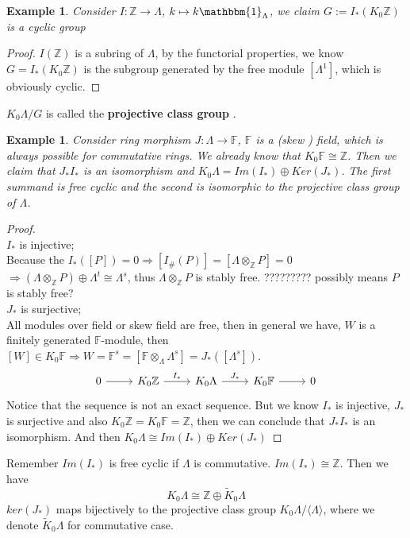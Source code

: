 \documentclass[11pt]{article}
\newtheorem{ex}[thm]{Example}
\newcommand{\intg}{\mathbb Z}
\newcommand{\bbf}{\mathbb F}
\newcommand{\rta}{\rightarrow}
\newcommand{\Lrta}{\Longrightarrow}
\newcommand{\lgl}{\langle}
\newcommand{\rgl}{\rangle}
\begin{document}
\begin{ex}
Consider $I: \intg \rta \Lambda$, $k\mapsto k \mathbbm{1}_\Lambda$, we claim $G:=I_*(K_0 \intg)$ is a cyclic group
\end{ex}
\begin{proof}
$I(\intg)$ is a subring of $\Lambda$, by the functorial properties, we know $G=I_*(K_0 \intg)$ is the subgroup generated by the free module $[\Lambda^1]$, which is obviously cyclic.
\end{proof}
$K_0\Lambda/G $ is called the \textbf{projective class group }.

\begin{ex}
Consider ring morphism 
$J:\Lambda\rta \bbf$, $\bbf$ is a (skew ) field, which is always possible for commutative rings. We already know that $K_0\bbf\cong \intg$. Then we claim that $J_* I_*$ is an isomorphism and $K_0 \Lambda = Im (I_*)\oplus Ker (J_*)$. The first summand is free cyclic and the second is isomorphic to the projective class group of $\Lambda$.
\end{ex}

\begin{proof}\ \\ 
$I_*$ is injective;\\ 
Because the $I_*([P])=0\Lrta [I_\#(P)]=[\Lambda \otimes_{\intg} P]=0$ $\Lrta (\Lambda\otimes_\intg P)\oplus \Lambda^t\cong \Lambda^s$, thus $\Lambda\otimes_\intg P$ is stably free. ????????? possibly means $P$ is stably free?\\
$J_*$ is surjective;\\
All modules over field or skew field are free, then in general we have, $W$ is a finitely generated $\bbf$-module, then $[W]\in K_0 \bbf\Lrta W=\bbf^s=[\bbf \otimes_\Lambda \Lambda^s]=J_*([\Lambda^s])$.
\[ \begin{tikzcd}
	0\arrow{r}&K_0 \intg \arrow{r}{I_*} & K_0 \Lambda \arrow{r}{J_*} & K_0 \bbf\arrow{r}& 0%
	\end{tikzcd}\]	
Notice that the sequence is not an exact sequence. But we know $I_*$ is injective, $J_*$ is surjective and also $K_0 \intg=K_0\bbf=\intg$, then we can conclude that $J_*I_*$ is an isomorphism. And then $K_0\Lambda\cong Im (I_*)\oplus Ker (J_*)$
\end{proof}

Remember $Im(I_*)$ is free cyclic if $\Lambda$ is commutative. $Im(I_*)\cong \intg$.
Then we have
$$
K_0\Lambda\cong\intg\oplus \tilde{K}_0\Lambda
$$
$ker(J_*)$ maps bijectively to the projective class group $K_0 \Lambda/\lgl\Lambda\rgl$, where we denote $\tilde{K}_0 \Lambda$ for commutative case.
\end{document}
